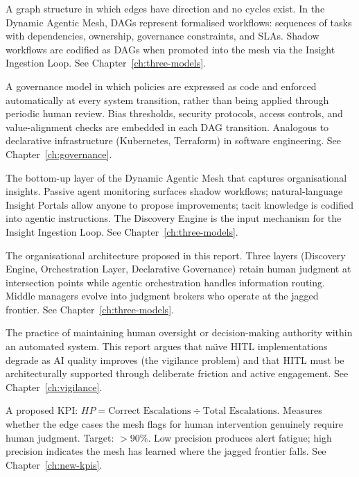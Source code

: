 \begin{description}[style=nextline, leftmargin=2em, font=\bfseries\color{navyblue}]
\item[DAG (Directed Acyclic Graph)]
A graph structure in which edges have direction and no cycles exist. In the Dynamic Agentic Mesh, DAGs represent formalised workflows: sequences of tasks with dependencies, ownership, governance constraints, and SLAs. Shadow workflows are codified as DAGs when promoted into the mesh via the Insight Ingestion Loop. See Chapter~\ref{ch:three-models}.

\item[Declarative Governance]
A governance model in which policies are expressed as code and enforced automatically at every system transition, rather than being applied through periodic human review. Bias thresholds, security protocols, access controls, and value-alignment checks are embedded in each DAG transition. Analogous to declarative infrastructure (Kubernetes, Terraform) in software engineering. See Chapter~\ref{ch:governance}.

\item[Discovery Engine]
The bottom-up layer of the Dynamic Agentic Mesh that captures organisational insights. Passive agent monitoring surfaces shadow workflows; natural-language Insight Portals allow anyone to propose improvements; tacit knowledge is codified into agentic instructions. The Discovery Engine is the input mechanism for the Insight Ingestion Loop. See Chapter~\ref{ch:three-models}.

\item[Dynamic Agentic Mesh]
The organisational architecture proposed in this report. Three layers (Discovery Engine, Orchestration Layer, Declarative Governance) retain human judgment at intersection points while agentic orchestration handles information routing. Middle managers evolve into judgment brokers who operate at the jagged frontier. See Chapter~\ref{ch:three-models}.

\item[HITL (Human-in-the-Loop)]
The practice of maintaining human oversight or decision-making authority within an automated system. This report argues that na\"{\i}ve HITL implementations degrade as AI quality improves (the vigilance problem) and that HITL must be architecturally supported through deliberate friction and active engagement. See Chapter~\ref{ch:vigilance}.

\item[HITL Precision (HP)]
A proposed KPI: $HP = \text{Correct Escalations} \div \text{Total Escalations}$. Measures whether the edge cases the mesh flags for human intervention genuinely require human judgment. Target: $>90\%$. Low precision produces alert fatigue; high precision indicates the mesh has learned where the jagged frontier falls. See Chapter~\ref{ch:new-kpis}.


\end{description}
